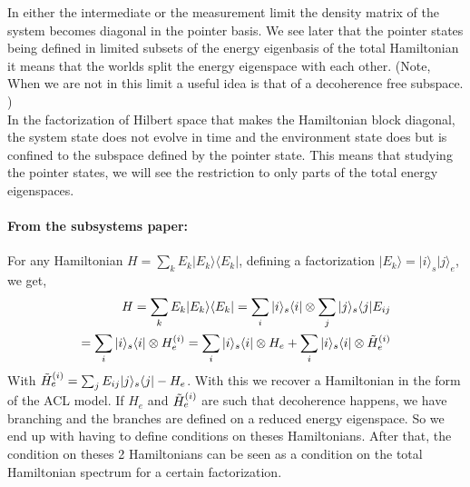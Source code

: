 \documentclass{article}
\begin{document}
In either the intermediate or the measurement limit the density matrix of the system becomes diagonal in the pointer basis. We see later that the pointer states being defined in limited subsets of the energy eigenbasis of the total Hamiltonian it means that the worlds split the energy eigenspace with each other. (Note, When we are not in this limit a useful idea is that of a decoherence free subspace. )\\

In the factorization of Hilbert space that makes the Hamiltonian block diagonal, the system state does not evolve in time and the environment state does but is confined to the subspace defined by the pointer state. This means that studying the pointer states, we will see the restriction to only parts of the total energy eigenspaces.

\paragraph{From the subsystems paper:} For any Hamiltonian $H=\sum_kE_k|E_k\rangle\langle E_k|$, defining a factorization $|E_k\rangle=|i\rangle_s|j\rangle_e$, we get,
\begin{align}
    H=\sum_kE_k|E_k\rangle\langle E_k|=\sum_i|i\rangle_s\langle i|\otimes\sum_j|j\rangle_s\langle j|E_{ij}\\
    =\sum_i|i\rangle_s\langle i|\otimes H^{(i)}_e = \sum_i|i\rangle_s\langle i|\otimes H_e+\sum_i|i\rangle_s\langle i|\otimes \Tilde{H}^{(i)}_e
\end{align}
With $\Tilde{H}^{(i)}_e = \sum_jE_{ij}|j\rangle_s\langle j|-H_e$. With this we recover a Hamiltonian in the form of the ACL model. If $H_e$ and $\Tilde{H}^{(i)}_e$ are such that decoherence happens, we have branching and the branches are defined on a reduced energy eigenspace.
So we end up with having to define conditions on theses Hamiltonians. After that, the condition on theses 2 Hamiltonians can be seen as a condition on the total Hamiltonian spectrum for a certain factorization.
\end{document}
